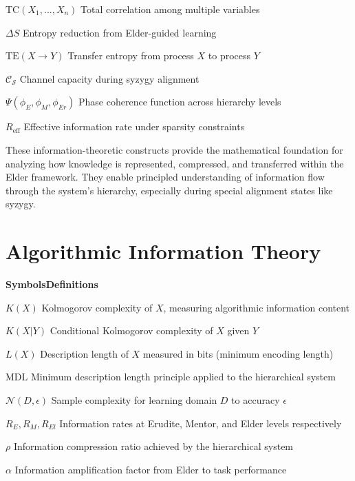 \begin{multicols}{2}
\noindent$\text{TC}(X_1,...,X_n)$ \dotfill Total correlation among multiple variables

\noindent$\Delta S$ \dotfill Entropy reduction from Elder-guided learning

\noindent$\text{TE}(X \rightarrow Y)$ \dotfill Transfer entropy from process $X$ to process $Y$

\noindent$\mathcal{C}_{\mathcal{S}}$ \dotfill Channel capacity during syzygy alignment

\noindent$\Psi(\phi_E, \phi_M, \phi_{Er})$ \dotfill Phase coherence function across hierarchy levels

\noindent$R_{\text{eff}}$ \dotfill Effective information rate under sparsity constraints
\end{multicols}

\vspace{1cm}
\begin{center}
These information-theoretic constructs provide the mathematical foundation for analyzing how knowledge is represented, compressed, and transferred within the Elder framework. They enable principled understanding of information flow through the system's hierarchy, especially during special alignment states like syzygy.
\end{center}

\clearpage
\chapter*{Algorithmic Information Theory}

\begin{multicols}{2}
\noindent\textbf{\large Symbols}\hfill\textbf{\large Definitions}

\vspace{0.3cm}
\noindent$K(X)$ \dotfill Kolmogorov complexity of $X$, measuring algorithmic information content

\noindent$K(X|Y)$ \dotfill Conditional Kolmogorov complexity of $X$ given $Y$

\noindent$L(X)$ \dotfill Description length of $X$ measured in bits (minimum encoding length)

\noindent$\text{MDL}$ \dotfill Minimum description length principle applied to the hierarchical system

\noindent$\mathcal{N}(D, \epsilon)$ \dotfill Sample complexity for learning domain $D$ to accuracy $\epsilon$

\noindent$R_E, R_M, R_{El}$ \dotfill Information rates at Erudite, Mentor, and Elder levels respectively

\noindent$\rho$ \dotfill Information compression ratio achieved by the hierarchical system

\noindent$\alpha$ \dotfill Information amplification factor from Elder to task performance
\end{multicols}

